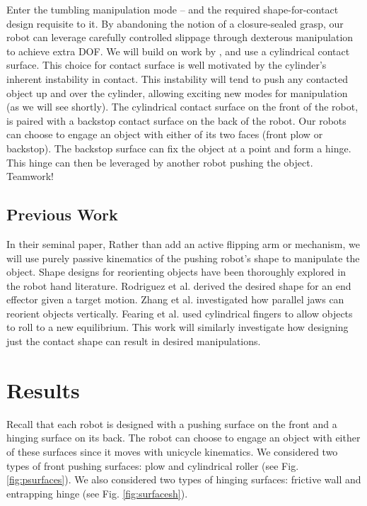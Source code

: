\documentclass[runningheads,a4paper]{llncs}
\begin{document}
Enter the tumbling manipulation mode -- and the required shape-for-contact design requisite to it.
By abandoning the notion of a closure-sealed grasp, our robot can leverage carefully controlled slippage through dexterous manipulation to achieve extra DOF.
We will build on work by \cite{fearing1986simplified}, and use a cylindrical contact surface.
This choice for contact surface is well motivated by the cylinder's inherent instability in contact.
This instability will tend to push any contacted object up and over the cylinder, allowing exciting new modes for manipulation (as we will see shortly).
The cylindrical contact surface on the front of the robot, is paired with a backstop contact surface on the back of the robot.
Our robots can choose to engage an object with either of its two faces (front plow or backstop).
The backstop surface can fix the object at a point and form a hinge.
This hinge can then be leveraged by another robot pushing the object. Teamwork!

\subsection{Previous Work}
In their seminal paper,
Rather than add an active flipping arm or mechanism, we will use purely passive kinematics of the pushing robot's shape to manipulate the object.
Shape designs for reorienting objects have been thoroughly explored in the robot hand literature.
Rodriguez et al.\cite{rodriguez2013effector} derived the desired shape for an end effector given a target motion.
Zhang et al.\cite{zhang2002gripper} investigated how parallel jaws can reorient objects vertically.
Fearing et al. \cite{fearing1986simplified} used cylindrical fingers to allow objects to roll to a new equilibrium.
This work will similarly investigate how designing just the contact shape can result in desired manipulations.

\clearpage
\section{Results}
Recall that each robot is designed with a pushing surface on the front and a hinging surface on its back.
The robot can choose to engage an object with either of these surfaces since it moves with unicycle kinematics.
We considered two types of front pushing surfaces: plow and cylindrical roller (see Fig. \ref{fig:psurfaces}).
We also considered two types of hinging surfaces: frictive wall and entrapping hinge (see Fig. \ref{fig:surfacesh}).
\end{document}
